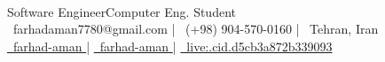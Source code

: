 \documentclass[]{awesome-cv}
\begin{document}
    
\begin{center}
	  \\
	\vspace{2mm}
	\textcolor{awesome}{Software Engineer{\enskip\cdotp\enskip}Computer Eng. Student} \\
	\vspace{2mm}
	{\faEnvelope\ farhadaman7780@gmail.com} | {\faMobile\ (+98) 904-570-0160} | {\faMapMarker\ Tehran, Iran} \\
	{\href{https://linkedin.com/in/farhad-aman}{ \faLinkedin\ farhad-aman }} | {\href{https://github.com/farhad-aman}{ \faGithub\ farhad-aman }} | {\href{skype:live:.cid.d5cb3a872b339093?chat}{ \faSkype\ live:.cid.d5cb3a872b339093 }}
\end{center}
\end{document}
